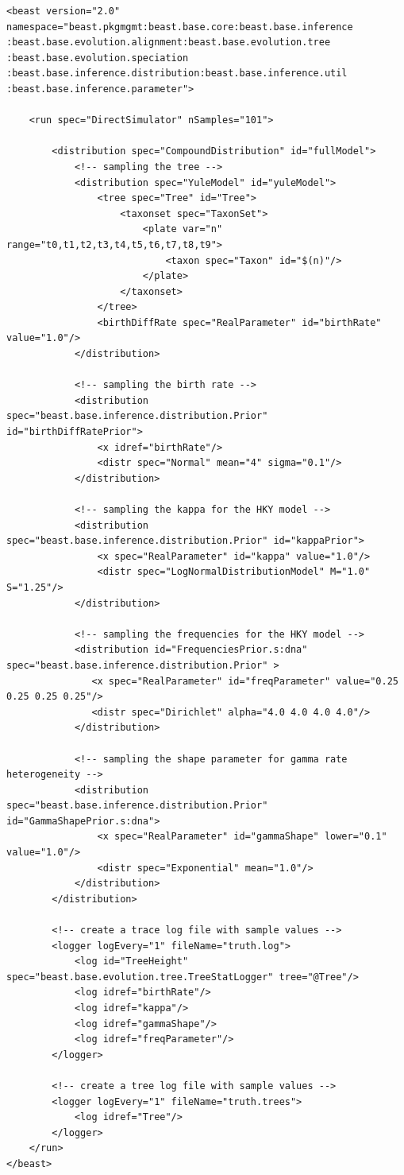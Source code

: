 \documentclass[oneside]{article}
\begin{document}
{\scriptsize\begin{lstlisting}
<beast version="2.0" namespace="beast.pkgmgmt:beast.base.core:beast.base.inference
:beast.base.evolution.alignment:beast.base.evolution.tree :beast.base.evolution.speciation
:beast.base.inference.distribution:beast.base.inference.util :beast.base.inference.parameter">

    <run spec="DirectSimulator" nSamples="101">

        <distribution spec="CompoundDistribution" id="fullModel">
        	<!-- sampling the tree -->
            <distribution spec="YuleModel" id="yuleModel">
                <tree spec="Tree" id="Tree">
                    <taxonset spec="TaxonSet">
                    	<plate var="n" range="t0,t1,t2,t3,t4,t5,t6,t7,t8,t9">
	                        <taxon spec="Taxon" id="$(n)"/>
	                    </plate>
                    </taxonset>
                </tree>
                <birthDiffRate spec="RealParameter" id="birthRate" value="1.0"/>
            </distribution>

        	<!-- sampling the birth rate -->
            <distribution spec="beast.base.inference.distribution.Prior" id="birthDiffRatePrior">
                <x idref="birthRate"/>
                <distr spec="Normal" mean="4" sigma="0.1"/>
            </distribution>

        	<!-- sampling the kappa for the HKY model -->
            <distribution spec="beast.base.inference.distribution.Prior" id="kappaPrior">
                <x spec="RealParameter" id="kappa" value="1.0"/>
                <distr spec="LogNormalDistributionModel" M="1.0" S="1.25"/>
            </distribution>

        	<!-- sampling the frequencies for the HKY model -->
            <distribution id="FrequenciesPrior.s:dna" spec="beast.base.inference.distribution.Prior" >
               <x spec="RealParameter" id="freqParameter" value="0.25 0.25 0.25 0.25"/>
               <distr spec="Dirichlet" alpha="4.0 4.0 4.0 4.0"/>
            </distribution>

        	<!-- sampling the shape parameter for gamma rate heterogeneity -->
            <distribution spec="beast.base.inference.distribution.Prior" id="GammaShapePrior.s:dna">
                <x spec="RealParameter" id="gammaShape" lower="0.1" value="1.0"/>
            	<distr spec="Exponential" mean="1.0"/>
    	    </distribution>
        </distribution>

		<!-- create a trace log file with sample values -->
        <logger logEvery="1" fileName="truth.log">
            <log id="TreeHeight" spec="beast.base.evolution.tree.TreeStatLogger" tree="@Tree"/>
            <log idref="birthRate"/>
            <log idref="kappa"/>
            <log idref="gammaShape"/>
            <log idref="freqParameter"/>
        </logger>

		<!-- create a tree log file with sample values -->
        <logger logEvery="1" fileName="truth.trees">
            <log idref="Tree"/>
        </logger>
    </run>
</beast>
\end{lstlisting}
}
\end{document}
